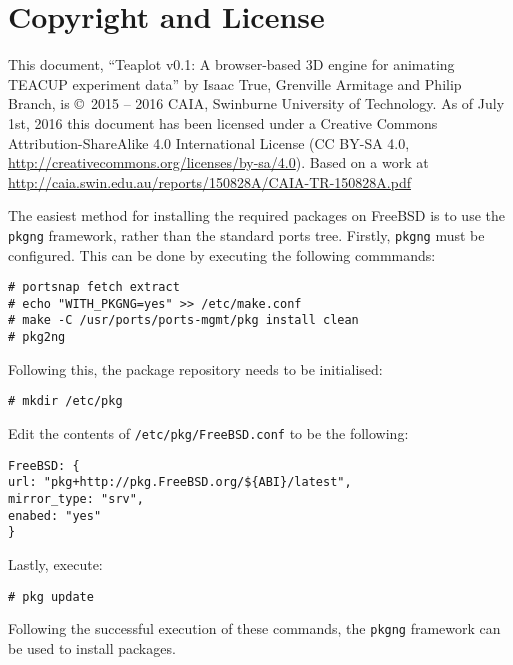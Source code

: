 \documentclass[a4paper,twocolumn,english,11pt, a4paper, conference]{IEEEtran}
\begin{document}
\section*{Copyright and License\label{sec:Copying}}

This document, ``Teaplot v0.1: A browser-based 3D engine for animating TEACUP experiment data''
by Isaac True, Grenville Armitage and Philip Branch, is \copyright~2015
-- 2016 CAIA, Swinburne University of Technology. As of July 1st, 2016
this document has been licensed under a Creative Commons Attribution-ShareAlike
4.0 International License (CC BY-SA 4.0, \url{http://creativecommons.org/licenses/by-sa/4.0}).
Based on a work at \url{http://caia.swin.edu.au/reports/150828A/CAIA-TR-150828A.pdf}




\label{appendix:freebsd}
The easiest method for installing the required packages on FreeBSD is to use the \texttt{pkgng} framework, rather than the standard ports tree. Firstly, \texttt{pkgng} must be configured. This can be done by executing the following commmands:
\begin{lstlisting}
# portsnap fetch extract
# echo "WITH_PKGNG=yes" >> /etc/make.conf
# make -C /usr/ports/ports-mgmt/pkg install clean
# pkg2ng
\end{lstlisting}
Following this, the package repository needs to be initialised:
\begin{lstlisting}
# mkdir /etc/pkg
\end{lstlisting}
Edit the contents of \texttt{/etc/pkg/FreeBSD.conf} to be the following: 
\begin{lstlisting}
FreeBSD: {
url: "pkg+http://pkg.FreeBSD.org/${ABI}/latest",
mirror_type: "srv",
enabed: "yes"
}
\end{lstlisting}
Lastly, execute:
\begin{lstlisting}
# pkg update
\end{lstlisting}
Following the successful execution of these commands, the \texttt{pkgng} framework can be used to install packages.


\end{document}
